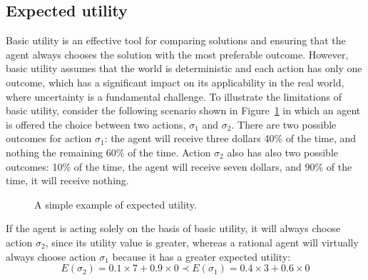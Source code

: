 \subsection{Expected utility}
Basic utility is an effective tool for comparing solutions and ensuring that the agent always chooses the solution with the most preferable outcome. However, basic utility assumes that the world is deterministic and each action has only one outcome, which has a significant impact on its applicability in the real world, where uncertainty is a fundamental challenge.
To illustrate the limitations of basic utility, consider the following scenario shown in Figure~\ref{fig:expected_utility} in which an agent is offered the choice between two actions, $\sigma_1$ and $\sigma_2$. There are two possible outcomes for action $\sigma_1$: the agent will receive three dollars 40\% of the time, and nothing the remaining 60\% of the time. Action $\sigma_2$ also has also two possible outcomes: 10\% of the time, the agent will receive seven dollars, and 90\% of the time, it will receive nothing.

\begin{figure}[H]
    \centering
        \caption{A simple example of expected utility.}
        \label{fig:expected_utility}
\end{figure}

If the agent is acting solely on the basis of basic utility, it will always choose action $\sigma_2$, since its utility value is greater, whereas a rational agent will virtually always choose action $\sigma_1$ because it has a greater expected utility:
$$ E(\sigma_2) = 0.1 \times 7 + 0.9 \times 0  \prec E(\sigma_1) = 0.4 \times 3 + 0.6 \times 0 $$

